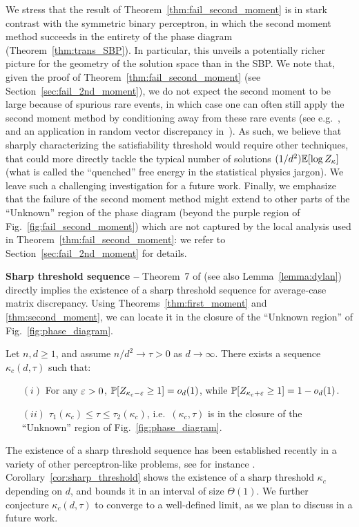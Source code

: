 \myskip
We stress that the result of Theorem~\ref{thm:fail_second_moment} is in stark contrast with the symmetric binary perceptron, in 
which the second moment method succeeds in the entirety of the phase diagram (Theorem~\ref{thm:trans_SBP}).
In particular, this unveils a potentially richer picture for the geometry of the solution space than in the SBP.
We note that, given the proof of Theorem~\ref{thm:fail_second_moment} (see Section~\ref{sec:fail_2nd_moment}), 
we do not expect the second moment to be large because of spurious rare events, in which case one can often
still apply the second moment method by conditioning away from these rare events (see e.g.~\cite{janson1996second}, and an application in random vector discrepancy in~\cite{altschuler2022discrepancy}). 
As such, we believe that sharply characterizing the satisfiability threshold would require other techniques, that could more directly tackle the typical number of solutions 
$(1/d^2) \mathbb{E}[\log Z_\kappa]$ (what is called the ``quenched'' free energy in the statistical physics jargon).
We leave such a challenging investigation for a future work.
Finally, we emphasize that the failure of the second moment method might extend to other parts of the ``Unknown'' region of the phase diagram
(beyond the purple region of Fig.~\ref{fig:fail_second_moment}) 
which are not captured by the local analysis used in Theorem~\ref{thm:fail_second_moment}: we refer to Section~\ref{sec:fail_2nd_moment} for details.

\myskip 
\textbf{Sharp threshold sequence --}
Theorem~7 of \cite{altschuler2023zero} (see also Lemma~\ref{lemma:dylan})
directly implies the existence of a sharp threshold sequence for average-case matrix discrepancy. 
Using Theorems~\ref{thm:first_moment} and \ref{thm:second_moment}, we can locate it
in the closure of the ``Unknown region'' of Fig.~\ref{fig:phase_diagram}.
\begin{corollary}\label{cor:sharp_threshold}
    \noindent
    Let $n, d \geq 1$, and assume $n/d^2 \to \tau > 0$ as $d\to \infty$. There exists a sequence 
    $\kappa_c(d,\tau)$ such that: 
    \begin{itemize}
        \item[$(i)$] For any $\varepsilon > 0$, $\mathbb{P}[Z_{\kappa_c - \varepsilon} \geq 1] = o_d(1)$, while $\mathbb{P}[Z_{\kappa_c + \varepsilon} \geq 1] = 1 - o_d(1)$.
        \item[$(ii)$]  $\tau_1(\kappa_c) \leq \tau \leq \tau_2(\kappa_c)$, i.e.\ $(\kappa_c,\tau)$ is in the closure of the ``Unknown'' region of Fig.~\ref{fig:phase_diagram}.
    \end{itemize}
\end{corollary}
\noindent
The existence of a sharp threshold sequence has been established recently in a variety of other perceptron-like problems, see for instance \cite{talagrand1999self,talagrand2011mean,xu2021sharp,nakajima2023sharp,altschuler2023zero}.
Corollary~\ref{cor:sharp_threshold} shows the existence of a sharp threshold $\kappa_c$ depending on $d$, and bounds it in an interval of size $\Theta(1)$. 
We further conjecture $\kappa_c(d,\tau)$ to converge to a well-defined limit, as we plan to discuss in a future work.

